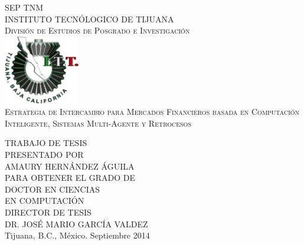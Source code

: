 \begin{titlepage}
  \begin{center}
  \textsc{\Large SEP}
  \:\:\:\:\:\:\:\:\:\:\:\:\:\:\:\:\:\:\:\:\:\:\:\:\:\:\:\:\:\:\:\:\:\:\:\:
\:\:\:\:\:\:\:\:\:\:\:\:\:\:\:\:\:\:\:\:\:\:\:\:\:\:\:\:\:\:\:\:\:\:\:\:
\:\:\:\:\:\:\:\:\:\:\:\:\:\:\:\:
  \textsc{\Large TNM}~\\[1cm]
  \textsc{\Large INSTITUTO TECNÓLOGICO DE TIJUANA}~\\[1cm]
  \textsc{\Large División de Estudios de Posgrado e
    Investigación}~\\[0.5cm]

    \includegraphics[width=0.25\textwidth]{./logos.png}~\\[1cm]

    
    \textsc{\LARGE Estrategia de Intercambio para
Mercados Financieros basada en
Computación Inteligente, Sistemas
Multi-Agente y Retrocesos}~\\[1.5cm]




\begin{minipage}{1\textwidth}
  \begin{flushright} \large
    TRABAJO DE TESIS~\\[0.5cm]
    \small
    PRESENTADO POR~\\[0.5cm]
    \large
    AMAURY HERNÁNDEZ ÁGUILA~\\[0.5cm]
    \small
    PARA OBTENER EL GRADO DE~\\[0.5cm]
    \large
    DOCTOR EN CIENCIAS~\\
    EN COMPUTACIÓN~\\[0.5cm]
    \small
    DIRECTOR DE TESIS~\\
    \large
    DR. JOSÉ MARIO GARCÍA VALDEZ~\\[0.5cm]
    \small
    Tijuana, B.C., México. Septiembre 2014
  \end{flushright}
\end{minipage}


\end{center}
\end{titlepage}
